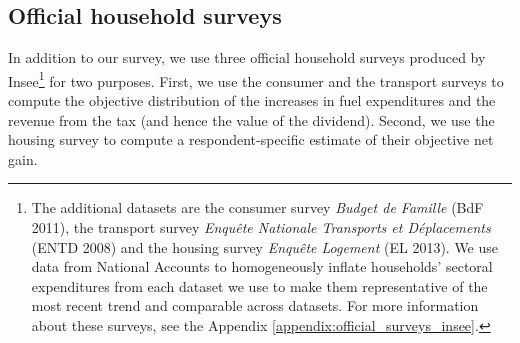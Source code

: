 \documentclass[12pt]{article} %
\begin{document}
\subsection{Official household surveys\label{subsec:Households-surveys}}

In addition to our survey, we use three official household surveys produced by Insee\footnote{The additional datasets are the consumer survey \emph{Budget de Famille} (BdF 2011), the transport survey \emph{Enquête Nationale Transports et Déplacements} (ENTD 2008) and the housing survey \emph{Enquête Logement} (EL 2013). We use data from National Accounts to homogeneously inflate households’ sectoral expenditures from each dataset we use to make them representative of the most recent trend and comparable across datasets. For more information about these surveys, see the Appendix \ref{appendix:official_surveys_insee}.} for two purposes. First, we use the consumer and the transport surveys to compute the objective distribution of the increases in fuel expenditures and the revenue from the tax (and hence the value of the dividend). Second, we use the housing survey to compute a respondent-specific estimate of their objective net gain.



\end{document}
